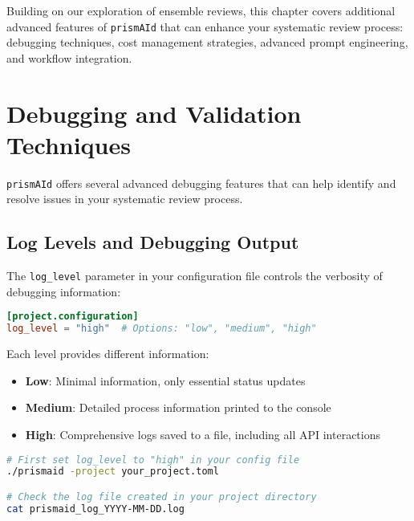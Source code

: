 Building on our exploration of ensemble reviews, this chapter covers additional advanced features of \texttt{prismAId} that can enhance your systematic review process: debugging techniques, cost management strategies, advanced prompt engineering, and workflow integration.

\section{Debugging and Validation Techniques}

\texttt{prismAId} offers several advanced debugging features that can help identify and resolve issues in your systematic review process.

\subsection{Log Levels and Debugging Output}

The \texttt{log\_level} parameter in your configuration file controls the verbosity of debugging information:

\begin{configbox}
\begin{lstlisting}[language=TOML]
[project.configuration]
log_level = "high"  # Options: "low", "medium", "high"
\end{lstlisting}
\end{configbox}

Each level provides different information:
\begin{itemize}
    \item \textbf{Low}: Minimal information, only essential status updates
    \item \textbf{Medium}: Detailed process information printed to the console
    \item \textbf{High}: Comprehensive logs saved to a file, including all API interactions
\end{itemize}


\begin{commandbox}
\begin{lstlisting}[language=Bash]
# First set log_level to "high" in your config file
./prismaid -project your_project.toml

# Check the log file created in your project directory
cat prismaid_log_YYYY-MM-DD.log
\end{lstlisting}
\end{commandbox}

